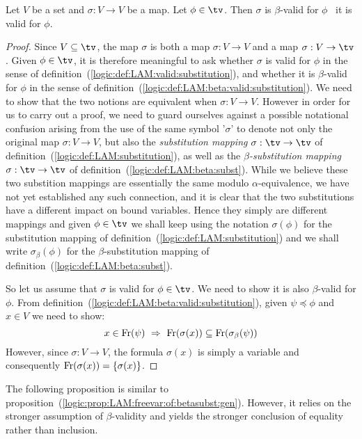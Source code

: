 \begin{prop}\label{logic:prop:LAM:valid:iff:beta:valid}
    Let $V$ be a set and $\sigma:V\to V$ be a map. Let $\phi\in\tv$. 
    Then $\sigma$ is $\beta$-valid for $\phi$ \ifand\ it is valid for $\phi$.
\end{prop}
\begin{proof}
    Since $V\subseteq\tv$, the map $\sigma$ is both a map $\sigma:V\to V$ and
    a map $\sigma:V\to\tv$. Given $\phi\in\tv$, it is therefore meaningful to 
    ask whether $\sigma$ is valid for $\phi$ in the sense of 
    definition~(\ref{logic:def:LAM:valid:substitution}), and whether it is
    $\beta$-valid for $\phi$ in the sense of 
    definition~(\ref{logic:def:LAM:beta:valid:substitution}). We need to show
    that the two notions are equivalent when $\sigma:V\to V$. 
    However in order for us to carry out a proof, we need to guard ourselves 
    against a possible notational confusion arising from the use of the same 
    symbol '$\sigma$' to denote not only the original map $\sigma:V\to V$, 
    but also the {\em substitution mapping} $\sigma:\tv\to\tv$ of 
    definition~(\ref{logic:def:LAM:substitution}), as well as the 
    {\em $\beta$-substitution mapping} $\sigma:\tv\to\tv$ of
    definition~(\ref{logic:def:LAM:beta:subst}). While we believe these 
    two substition mappings are essentially the same modulo 
    $\alpha$-equivalence, we have not yet established any such connection,
    and it is clear that the two substitutions have a different impact
    on bound variables. Hence they simply are different mappings and given
    $\phi\in\tv$ we shall keep using the notation $\sigma(\phi)$ for the 
    substitution mapping of definition~(\ref{logic:def:LAM:substitution})
    and we shall write $\sigma_{\beta}(\phi)$ for the $\beta$-substitution
    mapping of definition~(\ref{logic:def:LAM:beta:subst}).

    So let us assume that $\sigma$ is valid for $\phi\in\tv$. We need
    to show it is also $\beta$-valid for $\phi$. From
    definition~(\ref{logic:def:LAM:beta:valid:substitution}), given
    $\psi\preceq\phi$ and $x\in V$ we need to show:
    \[
        x\in\free(\psi)\ 
            \Rightarrow\ 
        \free(\sigma(x))\subseteq\free(\sigma_{\beta}(\psi))
    \]
    However, since $\sigma:V\to V$, the formula $\sigma(x)$ is simply
    a variable and consequently $\mbox{\rm Fr}(\sigma(x))=\{\sigma(x)\}$.
\end{proof}

The following proposition is similar to 
proposition~(\ref{logic:prop:LAM:freevar:of:betasubst:gen}). However,
it relies on the stronger assumption of $\beta$-validity and yields the
stronger conclusion of equality rather than inclusion.

